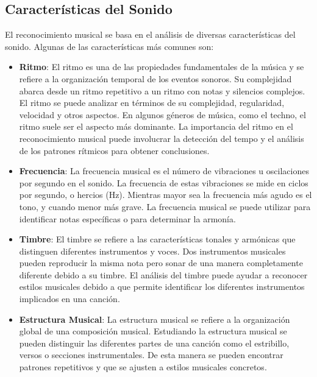 \subsection{Características del Sonido}

El reconocimiento musical se basa en el análisis de diversas características del sonido. Algunas de las características más comunes son:

\begin{itemize}
\item \textbf{Ritmo}: El ritmo es una de las propiedades fundamentales de la música y se refiere a la organización temporal de los eventos sonoros. Su complejidad abarca desde un ritmo repetitivo a un ritmo con notas y silencios complejos.
El ritmo se puede analizar en términos de su complejidad, regularidad, velocidad y otros aspectos. En algunos géneros de música, como el techno, el ritmo suele ser el aspecto más dominante.
La importancia del ritmo en el reconocimiento musical puede involucrar la detección del tempo y el análisis de los patrones rítmicos para obtener conclusiones.

\item \textbf{Frecuencia}: La frecuencia musical es el número de vibraciones u oscilaciones por segundo en el sonido. 
La frecuencia de estas vibraciones se mide en ciclos por segundo, o hercios (Hz). Mientras mayor sea la frecuencia más agudo es el tono, y cuando menor más grave.
La frecuencia musical se puede utilizar para identificar notas específicas o para determinar la armonía.

\item \textbf{Timbre}: El timbre se refiere a las características tonales y armónicas que distinguen diferentes instrumentos y voces. 
Dos instrumentos musicales pueden reproducir la misma nota pero sonar de una manera completamente diferente debido a su timbre.
El análisis del timbre puede ayudar a reconocer estilos musicales debido a que permite identificar los diferentes instrumentos implicados en una canción.

\item \textbf{Estructura Musical}: La estructura musical se refiere a la organización global de una composición musical.
Estudiando la estructura musical se pueden distinguir las diferentes partes de una canción como el estribillo, versos o secciones instrumentales. De esta manera se pueden encontrar patrones repetitivos y que se ajusten a estilos musicales concretos.
\end{itemize}

